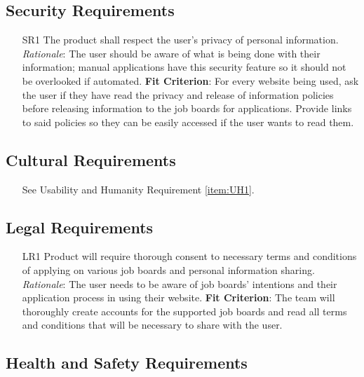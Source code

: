 \documentclass[12pt, titlepage]{article}
\begin{document}
\subsection{Security Requirements}

\begin{itemize}
    \item [SR1] The product shall respect the user's privacy of personal information.
	{\newline \emph{Rationale}: The user should be aware of what is being done with their information; manual applications have this security feature so it should not be overlooked if automated.  
	\newline \textbf{Fit Criterion}: For every website being used, ask the user if they have read the privacy and release of information policies before releasing information to the job boards for applications. Provide links to said policies so they can be easily accessed if the user wants to read them.}
\end{itemize}

\subsection{Cultural Requirements}
\begin{itemize}
    \item [] See Usability and Humanity Requirement \ref{item:UH1}.
\end{itemize}

\subsection{Legal Requirements}

\begin{itemize}
    \item [LR1] Product will require thorough consent to necessary terms and conditions of applying on various job boards and personal information sharing.
	{\newline \emph{Rationale}: The user needs to be aware of job boards' intentions and their application process in using their website.
	\newline \textbf{Fit Criterion}: The team will thoroughly create accounts for the supported job boards and read all terms and conditions that will be necessary to share with the user.}
\end{itemize}
	
\subsection{Health and Safety Requirements}
\end{document}
